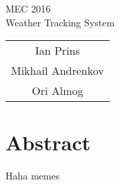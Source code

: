 \documentclass{article}
\begin{document}
\centering
\huge MEC 2016\\
\normalsize Weather Tracking System\\

\bigskip
\bigskip

\begin{tabular}{c}
	Ian Prins\\
	Mikhail Andrenkov\\
	Ori Almog\\
\end{tabular}

\newpage

\flushleft

\section{Abstract}

	Haha memes
\end{document}
